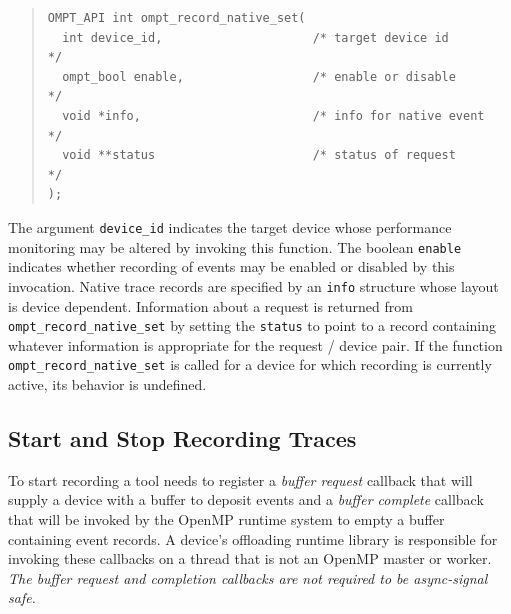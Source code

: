 \documentclass{article}
\begin{document}
\begin{quote}
\begin{verbatim}
OMPT_API int ompt_record_native_set(
  int device_id,                     /* target device id                */
  ompt_bool enable,                  /* enable or disable               */
  void *info,                        /* info for native event           */
  void **status                      /* status of request               */
);
\end{verbatim}
\end{quote}
The argument \verb|device_id| indicates the target device whose performance monitoring may be altered by invoking this function. The boolean \verb|enable| indicates whether recording of events may be enabled or disabled by this invocation.
Native trace records are specified by an \verb|info| structure whose layout is device dependent. Information about a request is returned from \verb|ompt_record_native_set| by setting the \verb|status| to point to a record containing whatever information is appropriate for the  request / device pair. If the function \verb|ompt_record_native_set| is called for a device for which recording is currently active, its behavior is undefined.

\subsection{Start and Stop Recording Traces}
\label{sec:start-stop-recording}

To start recording a tool needs to register a \emph{buffer request} callback that will supply a device with a buffer to deposit events and a \emph{buffer complete} callback that will be invoked by the OpenMP runtime system to empty a buffer containing event records. A device's offloading runtime library is responsible for invoking these callbacks on a thread that is not an OpenMP master or worker. {\em The buffer request and completion callbacks are not required to  be async-signal safe.}
\end{document}
